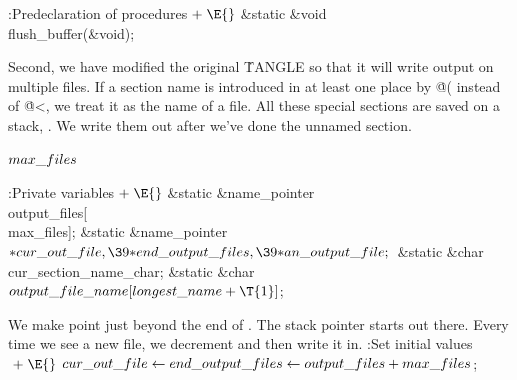 \B{}:Predeclaration of procedures\X${}\mathrel+\E{}$\5
\&{static} \&{void} \\{flush\_buffer}(\&{void});\par
\fi

Second, we have modified the original \.{TANGLE} so that it will write
output
on multiple files.
If a section name is introduced in at least one place by \.{@(}
instead of \.{@<}, we treat it as the name of a file.
All these special sections are saved on a stack, .
We write them out after we've done the unnamed section.

\Y\B\4\D$\\{max\_files}$ \5
\par
\Y\B\4:Private variables\X${}\mathrel+\E{}$\6
\&{static} \&{name\_pointer} \\{output\_files}[\\{max\_files}];\6
\&{static} \&{name\_pointer} ${}{*}\\{cur\_out\_file},\39{*}\\{end\_output%
\_files},\39{*}\\{an\_output\_file};{}$\6
\&{static} \&{char} \\{cur\_section\_name\_char};\6
\&{static} \&{char} ${}\\{output\_file\_name}[\\{longest\_name}+\T{1}]{}$;\par
\fi

We make  point just beyond the end of
. The stack pointer
 starts out there. Every time we see a new file, we
decrement  and then write it in.
\Y\B\4:Set initial values\X${}\mathrel+\E{}$\6
$\\{cur\_out\_file}\K\\{end\_output\_files}\K\\{output\_files}+\\{max%
\_files}{}$;\par
\fi

